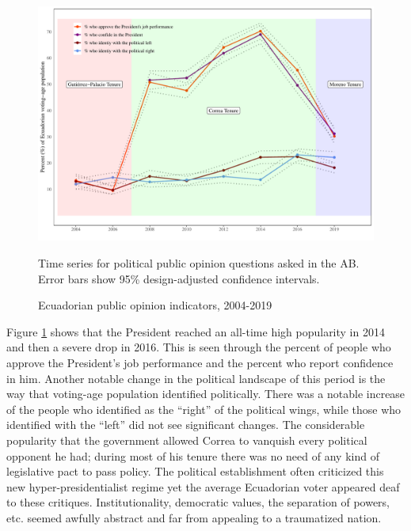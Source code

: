 \documentclass[12pt,a4]{article}\usepackage[]{graphicx}\usepackage[]{xcolor}
\makeatletter
\def\maxwidth{ %
  \ifdim\Gin@nat@width>\linewidth
    \linewidth
  \else
    \Gin@nat@width
  \fi
}
\newenvironment{knitrout}{}{} %
\makeatother
\begin{document}
\begin{figure}[htbp]
\centering
\begin{knitrout}
\color{fgcolor}

{\centering \includegraphics[width=\maxwidth]{figure/political_graph-1} 

}


\end{knitrout}
\caption{Ecuadorian public opinion indicators, 2004-2019}
\label{fig:ecua_pol}
Time series for political public opinion questions asked in the AB. Error bars show 95\% design-adjusted confidence intervals.
\end{figure}

Figure \ref{fig:ecua_pol} shows that the President reached an all-time high popularity in 2014 and then a severe drop in 2016. This is seen through the percent of people who approve the President's job performance and the percent who report confidence in him. Another notable change in the political landscape of this period is the way that voting-age population identified politically. There was a notable increase of the people who identified as the \enquote{right} of the political wings, while those who identified with the \enquote{left} did not see significant changes. The considerable popularity that the government allowed Correa to vanquish every political opponent he had; during most of his tenure there was no need of any kind of legislative pact to pass policy. The political establishment often criticized this new hyper-presidentialist regime yet the average Ecuadorian voter appeared deaf to these critiques. Institutionality, democratic values, the separation of powers, etc. seemed awfully abstract and far from appealing to a traumatized nation. 
\end{document}
